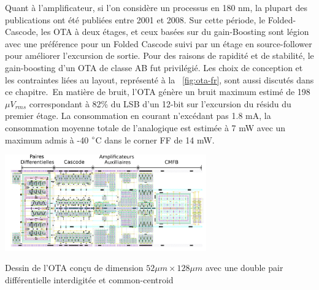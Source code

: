 \begin{mdframed}[linecolor=Prune,linewidth=1]
    Quant à l'amplificateur, si l'on considère un processus en 180 nm, la plupart des publications ont été publiées entre 2001 et 2008. Sur cette période, le Folded-Cascode, les OTA à deux étages, et ceux basées sur du gain-Boosting sont légion avec une préférence pour un Folded Cascode suivi par un étage en source-follower pour améliorer l'excursion de sortie. Pour des raisons de rapidité et de stabilité, le gain-boosting d'un OTA de classe AB fut privilégié. Les choix de conception et les contraintes liées au layout, représenté à la \figurename~\ref{fig:ota-fr}, sont aussi discutés dans ce chapitre. En matière de bruit, l'OTA génère un bruit maximum estimé de 198 \(\mu V _{rms} \) correspondant à 82\% du LSB d'un 12-bit sur l'excursion du résidu du premier étage. La consommation en courant n'excédant pas 1.8 mA, la consommation moyenne totale de l'analogique est estimée à 7 mW avec un maximum admis à -40 $\degree$C dans le corner FF de 14 mW.
    
    \begin{center}
        \centering
        \includegraphics[width=0.65\textwidth]{Chapter7/Figs/layout_ota_v2-fr.png}
        \caption[]{Dessin de l'OTA conçu de dimension \(52 \mu m \times 128 \mu m\) avec une double pair différentielle interdigitée et common-centroid}
        \label{fig:ota-fr}
    \end{center}
    

\end{mdframed}
